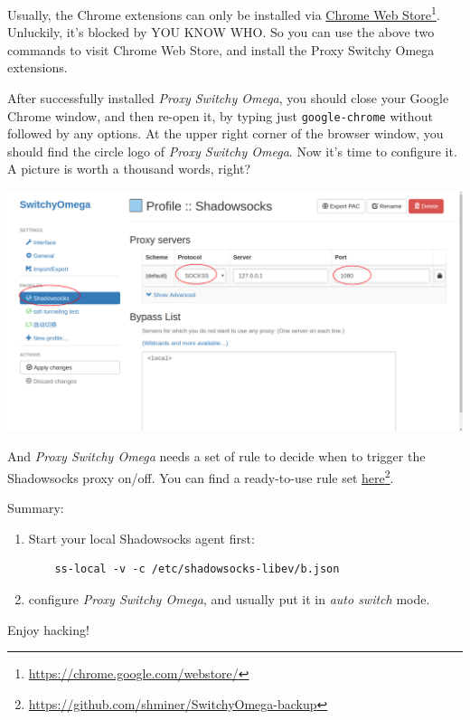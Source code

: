 \documentclass[12pt]{wx672article}
\begin{document}
Usually, the Chrome extensions can only be installed via \href{https://chrome.google.com/webstore/category/extensions?utm\_source=chrome-ntp-icon}{Chrome Web Store}\footnote{\url{https://chrome.google.com/webstore/}}. Unluckily, it's
blocked by YOU KNOW WHO. So you can use the above two commands to visit Chrome Web Store,
and install the Proxy Switchy Omega extensions.

After successfully installed \emph{Proxy Switchy Omega}, you should close your Google Chrome
window, and then re-open it, by typing just \texttt{google-chrome} without followed by any
options. At the upper right corner of the browser window, you should find the circle
logo of \emph{Proxy Switchy Omega}. Now it's time to configure it.
A picture is worth a thousand words, right?

\begin{center}
\includegraphics[width=.8\linewidth]{./switchyomega1.png}
\end{center}
And \emph{Proxy Switchy Omega} needs a set of rule to decide when to trigger the Shadowsocks
proxy on/off. You can find a ready-to-use rule set \href{https://github.com/shminer/SwitchyOmega-backup}{here}\footnote{\url{https://github.com/shminer/SwitchyOmega-backup}}. 

Summary:
\begin{enumerate}
\item Start your local Shadowsocks agent first:
\begin{verbatim}
    ss-local -v -c /etc/shadowsocks-libev/b.json
\end{verbatim}
\item configure \emph{Proxy Switchy Omega}, and usually put it in \emph{auto switch} mode.
\end{enumerate}


Enjoy hacking!
\end{document}
